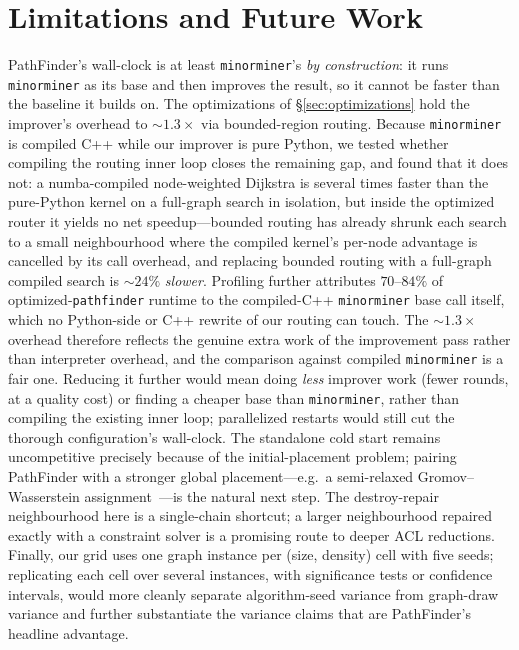 \documentclass[acmsmall,anonymous,nonacm]{acmart}
\begin{document}
\section{Limitations and Future Work}
\label{sec:limitations}

PathFinder's wall-clock is at least \texttt{minorminer}'s \emph{by construction}:
it runs \texttt{minorminer} as its base and then improves the result, so it cannot
be faster than the baseline it builds on. The optimizations of
\S\ref{sec:optimizations} hold the improver's overhead to ${\sim}1.3\times$ via
bounded-region routing. Because \texttt{minorminer} is compiled C++ while our
improver is pure Python, we tested whether compiling the routing inner loop closes
the remaining gap, and found that it does not: a numba-compiled node-weighted
Dijkstra is several times faster than the pure-Python kernel on a full-graph search
in isolation, but inside the optimized router it yields no net speedup---bounded
routing has already shrunk each search to a small neighbourhood where the compiled
kernel's per-node advantage is cancelled by its call overhead, and replacing
bounded routing with a full-graph compiled search is ${\sim}24\%$ \emph{slower}.
Profiling further attributes $70$--$84\%$ of optimized-\texttt{pathfinder} runtime
to the compiled-C++ \texttt{minorminer} base call itself, which no Python-side or
C++ rewrite of our routing can touch. The ${\sim}1.3\times$ overhead therefore
reflects the genuine extra work of the improvement pass rather than interpreter
overhead, and the comparison against compiled \texttt{minorminer} is a fair one.
Reducing it further would mean doing \emph{less} improver work (fewer rounds, at a
quality cost) or finding a cheaper base than \texttt{minorminer}, rather than
compiling the existing inner loop; parallelized restarts would still cut the
thorough configuration's wall-clock. The standalone cold start
remains uncompetitive precisely because of the initial-placement problem; pairing
PathFinder with a stronger global placement---e.g.\ a semi-relaxed
Gromov--Wasserstein assignment~\cite{vincentcuaz2022srgw}---is the natural next
step. The destroy-repair neighbourhood here is a single-chain shortcut;
a larger neighbourhood repaired exactly with a constraint solver
\cite{bernal2020ip} is a promising route to deeper ACL reductions. Finally, our
grid uses one graph instance per (size, density) cell with five seeds; replicating
each cell over several instances, with significance tests or confidence intervals,
would more cleanly separate algorithm-seed variance from graph-draw variance and
further substantiate the variance claims that are PathFinder's headline advantage.
\end{document}
